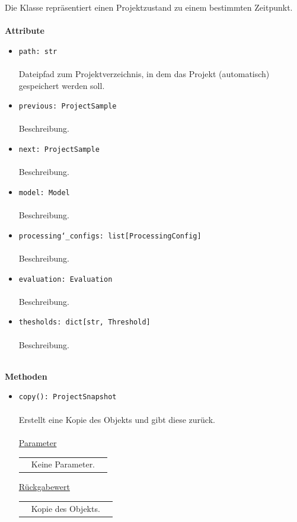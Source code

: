 \documentclass{article}
\begin{document}
\begin{itemize}
Die Klasse repräsentiert einen Projektzustand zu einem bestimmten Zeitpunkt.
\\\\

\textbf{Attribute}
\begin{itemize}\setlength\itemsep{3em}
\item \texttt{path: str}\\\\
Dateipfad zum Projektverzeichnis, in dem das Projekt (automatisch) gespeichert werden soll.
\item \texttt{previous: ProjectSample}\\\\
Beschreibung.
\item \texttt{next: ProjectSample}\\\\
Beschreibung.
\item \texttt{model: Model}\\\\
Beschreibung.
\item \texttt{processing\char`_configs: list[ProcessingConfig]}\\\\
Beschreibung.
\item \texttt{evaluation: Evaluation}\\\\
Beschreibung.
\item \texttt{thesholds: dict[str, Threshold]}\\\\
Beschreibung.
\\\\
\end{itemize}

\textbf{Methoden}
\begin{itemize}\setlength\itemsep{3em}
\item \texttt{copy(): ProjectSnapshot}\\\\
Erstellt eine Kopie des Objekts und gibt diese zurück.
\\\\
\underline{Parameter}\\
\begin{tabular}{lll}
 & Keine Parameter.
\end{tabular}

\underline{Rückgabewert}\\
\begin{tabular}{lll}
 & Kopie des Objekts.\\
\end{tabular}
\end{itemize}


\end{itemize}
\end{document}
